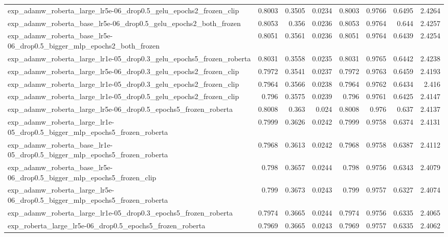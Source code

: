 \documentclass[a4paper,oneside,bibliography=totoc]{scrbook}
\begin{document}
\begin{landscape}
\begin{center}
\begin{longtable}{p{4cm} *{7}{r}}
        exp\_adamw\_roberta\_large\_lr5e-06\_drop0.5\_gelu\_epochs2\_frozen\_clip & 0.8003 & 0.3505 & 0.0234 & 0.8003 & 0.9766 & 0.6495 & 2.4264 \\ 
        exp\_adamw\_roberta\_base\_lr5e-06\_drop0.5\_gelu\_epochs2\_both\_frozen & 0.8053 & 0.356 & 0.0236 & 0.8053 & 0.9764 & 0.644 & 2.4257 \\ 
        exp\_adamw\_roberta\_base\_lr5e-06\_drop0.5\_bigger\_mlp\_epochs2\_both\_frozen & 0.8051 & 0.3561 & 0.0236 & 0.8051 & 0.9764 & 0.6439 & 2.4254 \\ 
        exp\_adamw\_roberta\_large\_lr1e-05\_drop0.3\_gelu\_epochs5\_frozen\_roberta & 0.8031 & 0.3558 & 0.0235 & 0.8031 & 0.9765 & 0.6442 & 2.4238 \\ 
        exp\_adamw\_roberta\_large\_lr5e-06\_drop0.3\_gelu\_epochs2\_frozen\_clip & 0.7972 & 0.3541 & 0.0237 & 0.7972 & 0.9763 & 0.6459 & 2.4193 \\ 
        exp\_adamw\_roberta\_large\_lr1e-05\_drop0.3\_gelu\_epochs2\_frozen\_clip & 0.7964 & 0.3566 & 0.0238 & 0.7964 & 0.9762 & 0.6434 & 2.416 \\ 
        exp\_adamw\_roberta\_large\_lr1e-05\_drop0.5\_gelu\_epochs2\_frozen\_clip & 0.796 & 0.3575 & 0.0239 & 0.796 & 0.9761 & 0.6425 & 2.4147 \\ 
        exp\_adamw\_roberta\_large\_lr5e-06\_drop0.5\_epochs5\_frozen\_roberta & 0.8008 & 0.363 & 0.024 & 0.8008 & 0.976 & 0.637 & 2.4137 \\ 
        exp\_adamw\_roberta\_large\_lr1e-05\_drop0.5\_bigger\_mlp\_epochs5\_frozen\_roberta & 0.7999 & 0.3626 & 0.0242 & 0.7999 & 0.9758 & 0.6374 & 2.4131 \\ 
        exp\_adamw\_roberta\_base\_lr1e-05\_drop0.5\_bigger\_mlp\_epochs5\_frozen\_roberta & 0.7968 & 0.3613 & 0.0242 & 0.7968 & 0.9758 & 0.6387 & 2.4112 \\ 
        exp\_adamw\_roberta\_base\_lr5e-06\_drop0.5\_bigger\_mlp\_epochs5\_frozen\_clip & 0.798 & 0.3657 & 0.0244 & 0.798 & 0.9756 & 0.6343 & 2.4079 \\ 
        exp\_adamw\_roberta\_large\_lr5e-06\_drop0.5\_bigger\_mlp\_epochs5\_frozen\_roberta & 0.799 & 0.3673 & 0.0243 & 0.799 & 0.9757 & 0.6327 & 2.4074 \\ 
        exp\_adamw\_roberta\_large\_lr1e-05\_drop0.3\_epochs5\_frozen\_roberta & 0.7974 & 0.3665 & 0.0244 & 0.7974 & 0.9756 & 0.6335 & 2.4065 \\ 
        exp\_roberta\_large\_lr5e-06\_drop0.5\_epochs5\_frozen\_roberta & 0.7969 & 0.3665 & 0.0243 & 0.7969 & 0.9757 & 0.6335 & 2.4062 \\ 

\end{longtable}
\end{center}
\end{landscape}
\end{document}
